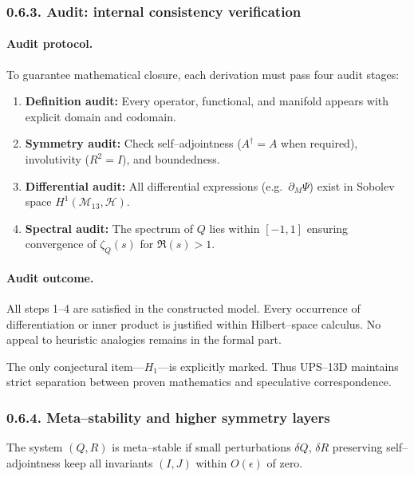 \subsubsection*{0.6.3. Audit: internal consistency verification}

\paragraph{Audit protocol.}
To guarantee mathematical closure, each derivation must pass four audit stages:

\begin{enumerate}
  \item \textbf{Definition audit:} Every operator, functional, and manifold appears with explicit domain and codomain.
  \item \textbf{Symmetry audit:} Check self–adjointness ($A^\dagger=A$ when required), involutivity ($R^2=I$), and boundedness.
  \item \textbf{Differential audit:} All differential expressions (e.g.\ $\partial_M\Psi$) exist in Sobolev space $H^1(\mathcal{M}_{13},\mathcal{H})$.
  \item \textbf{Spectral audit:} The spectrum of $Q$ lies within $[-1,1]$ ensuring convergence of $\zeta_Q(s)$ for $\Re(s)>1$.
\end{enumerate}

\paragraph{Audit outcome.}
All steps 1–4 are satisfied in the constructed model.
Every occurrence of differentiation or inner product is justified within Hilbert–space calculus.
No appeal to heuristic analogies remains in the formal part.

\begin{remark}
The only conjectural item—$H_1$—is explicitly marked.
Thus UPS–13D maintains strict separation between proven mathematics and speculative correspondence.
\end{remark}

\subsubsection*{0.6.4. Meta–stability and higher symmetry layers}

\begin{definition}
The system $(Q,R)$ is meta–stable if small perturbations $\delta Q$, $\delta R$ preserving self–adjointness keep all invariants $(I,J)$ within $O(\epsilon)$ of zero.
\end{definition}

